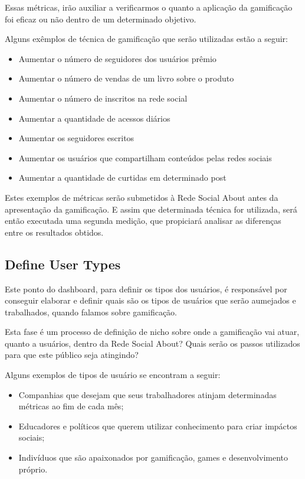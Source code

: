 Essas métricas, irão auxiliar a verificarmos o quanto a aplicação da gamificação foi eficaz ou
não dentro de um determinado objetivo.

Alguns exêmplos de técnica de gamificação que serão utilizadas estão a seguir:

\begin{itemize}
    \item Aumentar o número de seguidores dos usuários prêmio
    \item Aumentar o número de vendas de um livro sobre o produto
    \item Aumentar o número de inscritos na rede social
    \item Aumentar a quantidade de acessos diários
    \item Aumentar os seguidores escritos
    \item Aumentar os usuários que compartilham conteúdos pelas redes sociais
    \item Aumentar a quantidade de curtidas em determinado post
\end{itemize}

Estes exemplos de métricas serão submetidos à Rede Social About antes da apresentação da
gamificação. E assim que determinada técnica for utilizada, será então executada uma
segunda medição, que propiciará analisar as diferenças entre os resultados obtidos.

\subsection{Define User Types}
\label{sub:define_user_types}
Este ponto do dashboard, para definir os tipos dos usuários, é responsável por conseguir
elaborar e definir quais são os tipos de usuários que serão aumejados e trabalhados, quando
falamos sobre gamificação.

Esta fase é um processo de definição de nicho sobre onde a gamificação vai atuar, quanto a
usuários, dentro da Rede Social About? Quais serão os passos utilizados para que este público
seja atingindo?

Alguns exemplos de tipos de usuário se encontram a seguir:

\begin{itemize}
    \item Companhias que desejam que seus trabalhadores atinjam determinadas métricas
        ao fim de cada mês;
    \item Educadores e políticos que querem utilizar conhecimento para criar impáctos
        sociais;
    \item Indivíduos que são apaixonados por gamificação, games e desenvolvimento próprio.
\end{itemize}
 
